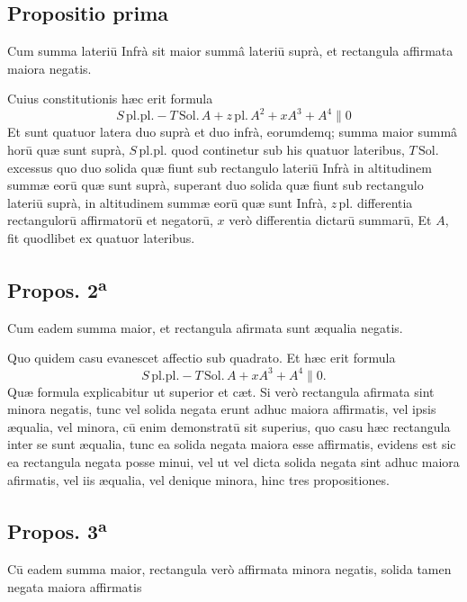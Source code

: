\documentclass[11pt,a4paper]{article}
\begin{document}
\subsection*{Propositio prima}

Cum summa lateriū Infrà sit maior summâ lateriū suprà, et rectangula affirmata maiora negatis.

Cuius constitutionis hæc erit formula
\[ S\,\mathrm{pl.pl.} - T\,\mathrm{Sol.}\,A + z\,\mathrm{pl.}\,A^{2} + xA^{3} + A^{4} \parallel 0 \]
Et sunt quatuor latera duo suprà et duo infrà, eorumdemq; summa maior summâ horū quæ sunt suprà, $S\,\mathrm{pl.pl.}$ quod continetur sub his quatuor lateribus, $T\,\mathrm{Sol.}$ excessus quo duo solida quæ fiunt sub rectangulo lateriū Infrà in altitudinem summæ eorū quæ sunt suprà, superant duo solida quæ fiunt sub rectangulo lateriū suprà, in altitudinem summæ eorū quæ sunt Infrà, $z\,\mathrm{pl.}$ differentia rectangulorū affirmatorū et negatorū, $x$ verò differentia dictarū summarū, Et $A$, fit quodlibet ex quatuor lateribus.

\subsection*{Propos. 2\textsuperscript{a}}

Cum eadem summa maior, et rectangula afirmata sunt æqualia negatis.

Quo quidem casu evanescet affectio sub quadrato. Et hæc erit formula
\[ S\,\mathrm{pl.pl.} - T\,\mathrm{Sol.}\,A + xA^{3} + A^{4} \parallel 0. \]
Quæ formula explicabitur ut superior et cæt. Si verò rectangula afirmata sint minora negatis, tunc vel solida negata erunt adhuc maiora affirmatis, vel ipsis æqualia, vel minora, cū enim demonstratū sit superius, quo casu hæc rectangula inter se sunt æqualia, tunc ea solida negata maiora esse affirmatis, evidens est sic ea rectangula negata posse minui, vel ut vel dicta solida negata sint adhuc maiora afirmatis, vel iis æqualia, vel denique minora, hinc tres propositiones.

\subsection*{Propos. 3\textsuperscript{a}}

Cū eadem summa maior, rectangula verò affirmata minora negatis, solida tamen negata maiora affirmatis
\end{document}
